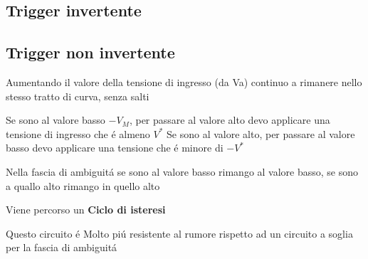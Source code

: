 \documentclass{article}
\begin{document}
\subsection{Trigger invertente}
\begin{center}
\end{center}


\subsection{Trigger non invertente}
\begin{center}
\end{center}

Aumentando il valore della tensione di ingresso (da Va) continuo a rimanere nello stesso tratto di curva, senza salti

Se sono al valore basso $-V_M$, per passare al valore alto devo applicare una tensione di ingresso che \'e almeno $V^*$
Se sono al valore alto, per passare al valore basso devo applicare una tensione che \'e minore di $-V^*$

Nella fascia di ambiguit\'a se sono al valore basso rimango al valore basso, se sono a quallo alto rimango in quello alto

Viene percorso un \textbf{Ciclo di isteresi}

Questo circuito \'e Molto pi\'u resistente al rumore rispetto ad un circuito a soglia per la fascia di ambiguit\'a
\end{document}
